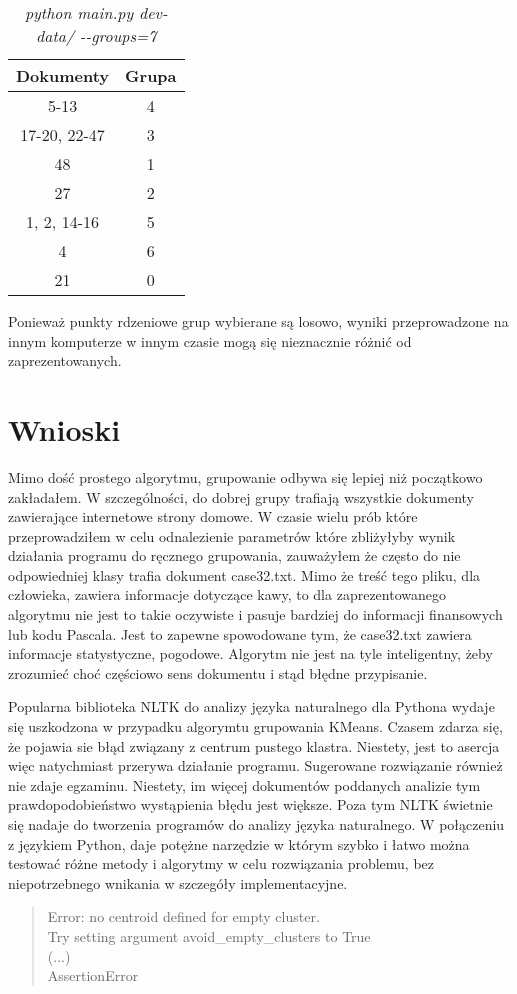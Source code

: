 \documentclass{article}
\begin{document}
\begin{table}[h]
\begin{center}
\begin{tabular}{ | c | c | }
\hline
Dokumenty & Grupa \\ \hline
5-13 & 4 \\ \hline
17-20, 22-47 & 3 \\ \hline
48 & 1 \\ \hline
27 & 2 \\ \hline
1, 2, 14-16 & 5 \\ \hline
4 & 6 \\ \hline
21 & 0 \\ \hline
\end{tabular}
\caption{\emph{python main.py dev-data/ -{}-groups=7}}
\end{center}
\end{table}

Ponieważ punkty rdzeniowe grup wybierane są losowo, wyniki przeprowadzone na innym komputerze w innym czasie mogą się nieznacznie różnić od zaprezentowanych.

\section{Wnioski}
Mimo dość prostego algorytmu, grupowanie odbywa się lepiej niż początkowo zakładałem. W szczególności, do dobrej grupy trafiają wszystkie dokumenty zawierające internetowe strony domowe. W czasie wielu prób które przeprowadziłem w celu odnalezienie parametrów które zbliżyłyby wynik działania programu do ręcznego grupowania, zauważyłem że często do nie odpowiedniej klasy trafia dokument case32.txt. Mimo że treść tego pliku, dla człowieka, zawiera informacje dotyczące kawy, to dla zaprezentowanego algorytmu nie jest to takie oczywiste i pasuje bardziej do informacji finansowych lub kodu Pascala. Jest to zapewne spowodowane tym, że case32.txt zawiera informacje statystyczne, pogodowe. Algorytm nie jest na tyle inteligentny, żeby zrozumieć choć częściowo sens dokumentu i stąd błędne przypisanie.

Popularna biblioteka NLTK do analizy języka naturalnego dla Pythona wydaje się uszkodzona w przypadku algorymtu grupowania KMeans. Czasem zdarza się, że pojawia sie błąd związany z centrum pustego klastra. Niestety, jest to asercja więc natychmiast przerywa działanie programu. Sugerowane rozwiązanie również nie zdaje egzaminu. Niestety, im więcej dokumentów poddanych analizie tym prawdopodobieństwo wystąpienia błędu jest większe. Poza tym NLTK świetnie się nadaje do tworzenia programów do analizy języka naturalnego. W połączeniu z językiem Python, daje potężne narzędzie w którym szybko i łatwo można testować różne metody i algorytmy w celu rozwiązania problemu, bez niepotrzebnego wnikania w szczegóły implementacyjne.
\begin{quotation}
Error: no centroid defined for empty cluster. \\
Try setting argument avoid\_empty\_clusters to True \\
(...) \\
AssertionError
\end{quotation}
\end{document}
